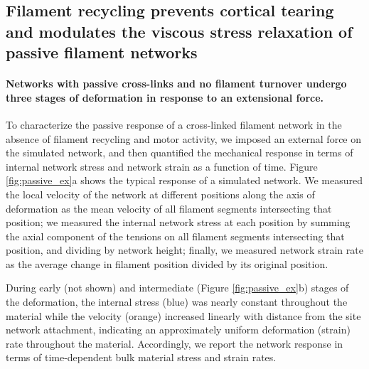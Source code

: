 \documentclass[10pt,letterpaper]{article}
\begin{document}
\subsection*{Filament recycling prevents cortical tearing and modulates the viscous stress relaxation of passive filament networks}
 
\paragraph{Networks with passive cross-links and no filament turnover undergo three stages of deformation in response to an extensional force.} 

To characterize the passive response of a cross-linked filament network in the absence of filament recycling and motor activity, we imposed an external force on the simulated network, and then quantified the mechanical response in terms of internal network stress and network strain as a function of time. Figure \ref{fig:passive_ex}a shows the typical response of a simulated network. We measured the local velocity of the network at different positions along the axis of deformation as the mean velocity of all filament segments intersecting that position; we measured the internal network stress at each position by summing the axial component of the tensions on all filament segments intersecting that position, and dividing by network height; finally, we measured network strain rate as the average change in filament position divided by its original position.

During early (not shown) and intermediate (Figure \ref{fig:passive_ex}b) stages of the deformation, the internal stress (blue) was nearly constant throughout the material while the velocity (orange) increased linearly with distance from the site network attachment, indicating an approximately uniform deformation (strain) rate throughout the material. Accordingly, we report the network response in terms of time-dependent bulk material stress and strain rates.
\end{document}
